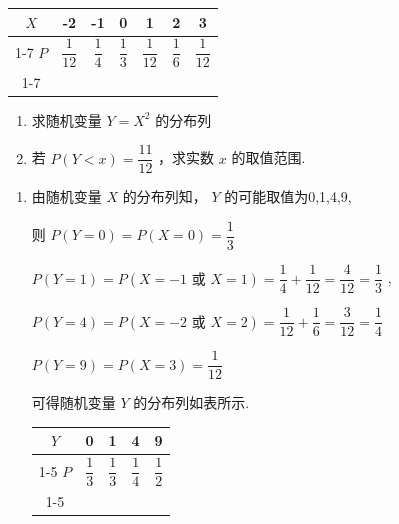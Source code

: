 \begin{enumerate}
\begin{enumerate}
\begin{center}
        \begin{tabular}{|c|c|c|c|c|c|c|}
        \hline
        $X$ & -2 & -1 & 0 & 1 & 2 & 3 \\
        \cline{1-7}
        $P$ & $\dfrac{1}{12}$ & $\dfrac{1}{4}$ & $\dfrac{1}{3}$ & $\dfrac{1}{12}$ & $\dfrac{1}{6}$ & $\dfrac{1}{12}$ \\
        \cline{1-7}
        \hline
        \end{tabular}
        
        \end{center}
        \begin{enumerate}
            \item 求随机变量 $Y = {X}^{2}$ 的分布列
            \item 若 $P\left( {Y < x}\right)  = \dfrac{11}{12}$ ，求实数 $x$ 的取值范围.
        \end{enumerate}
        \begin{jieda}
            \begin{enumerate}
                \item 由随机变量 $X$ 的分布列知， $Y$ 的可能取值为0,1,4,9,
                
                则 $P\left( {Y = 0}\right)  = P\left( {X = 0}\right)  = \dfrac{1}{3}$
                
                $P\left( {Y = 1}\right)  = P\left( {X =  - 1\text{ 或 }X = 1}\right)  = \dfrac{1}{4} + \dfrac{1}{12} = \dfrac{4}{12} = \dfrac{1}{3}$ ,
                
                $P\left( {Y = 4}\right)  = P\left( {X =  - 2\text{ 或 }X = 2}\right)  = \dfrac{1}{12} + \dfrac{1}{6} = \dfrac{3}{12} = \dfrac{1}{4}$
                
                $P\left( {Y = 9}\right)  = P\left( {X = 3}\right)  = \dfrac{1}{12}$
                
                可得随机变量 $Y$ 的分布列如表所示.
                
                \begin{center}
                
                \begin{tabular}{|c|c|c|c|c|}
                \hline
                $Y$ & 0 & 1 & 4 & 9 \\
                \cline{1-5}
                $P$ & $\dfrac{1}{3}$ & $\dfrac{1}{3}$ & $\dfrac{1}{4}$ & $\dfrac{1}{2}$ \\
                \cline{1-5}
                \hline
                \end{tabular}
                

\end{center}
\end{enumerate}
\end{jieda}
\end{enumerate}
\end{enumerate}
